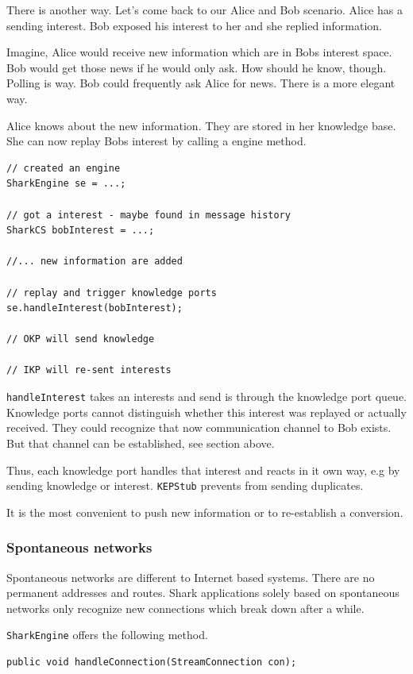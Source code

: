 There is another way. Let's come back to our Alice and Bob scenario. Alice has a sending interest. Bob exposed his interest to her and she replied information.

Imagine, Alice would receive new information which are in Bobs interest space.
Bob would get those news if he would only ask. How should he know, though. Polling is way. Bob could frequently ask Alice for news. There is a more elegant way.

Alice knows about the new information. They are stored in her knowledge base. She can now replay Bobs interest by calling a engine method.

\begin{verbatim}
// created an engine
SharkEngine se = ...;

// got a interest - maybe found in message history
SharkCS bobInterest = ...;

//... new information are added

// replay and trigger knowledge ports
se.handleInterest(bobInterest);

// OKP will send knowledge

// IKP will re-sent interests
\end{verbatim}

{\tt handleInterest} takes an interests and send is through the knowledge port queue. Knowledge ports cannot distinguish whether this interest was replayed or actually received. They could recognize that now communication channel to Bob exists. But that channel can be established, see section above.

Thus, each knowledge port handles that interest and reacts in it own way, e.g by sending knowledge or interest. {\tt KEPStub} prevents from sending duplicates. 

It is the most convenient to push new information or to re-establish a conversion.

\subsubsection{Spontaneous networks}
Spontaneous networks are different to Internet based systems. There are no permanent addresses and routes. Shark applications solely based on spontaneous networks only recognize new connections which break down after a while.

{\tt SharkEngine} offers the following method.

\begin{verbatim}
public void handleConnection(StreamConnection con);
\end{verbatim}

